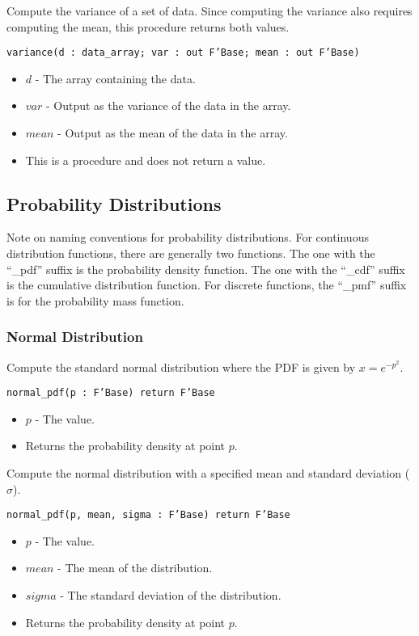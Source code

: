 \documentclass[10pt, openany]{book}
\newcommand{\function}[1]{\texttt{#1}}
\begin{document}
Compute the variance of a set of data.  Since computing the variance also requires computing the mean, this procedure returns both values.

\function{variance(d : data\_array; var : out F'Base; mean : out F'Base)}
\begin{itemize}
  \item $d$ - The array containing the data.
  \item $var$ - Output as the variance of the data in the array.
  \item $mean$ - Output as the mean of the data in the array.
  \item This is a procedure and does not return a value.
\end{itemize}

\subsection{Probability Distributions}
Note on naming conventions for probability distributions.  For continuous distribution functions, there are generally two functions.  The one with the ``\_pdf'' suffix is the probability density function.  The one with the ``\_cdf'' suffix is the cumulative distribution function.  For discrete functions, the ``\_pmf'' suffix is for the probability mass function.

\subsubsection{Normal Distribution}
Compute the standard normal distribution where the PDF is given by $x = e^{-p^2}$.

\function{normal\_pdf(p : F'Base) return F'Base}
\begin{itemize}
  \item $p$ - The value.
  \item Returns the probability density at point $p$.
\end{itemize}

Compute the normal distribution with a specified mean and standard deviation ($\sigma$).

\function{normal\_pdf(p, mean, sigma : F'Base) return F'Base}
\begin{itemize}
  \item $p$ - The value.
  \item $mean$ - The mean of the distribution.
  \item $sigma$ - The standard deviation of the distribution.
  \item Returns the probability density at point $p$.
\end{itemize}
\end{document}
